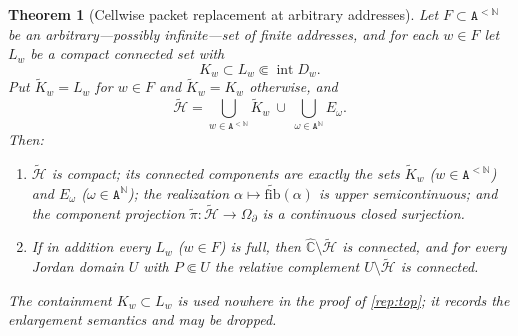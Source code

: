 \documentclass[11pt,reqno]{amsart}
\numberwithin{equation}{section}
\theoremstyle{plain}
\newtheorem{theorem}{Theorem}[section]
\theoremstyle{definition}
\theoremstyle{remark}
\newcommand{\Chat}{\widehat{\mathbb C}}
\newcommand{\N}{\mathbb N}
\newcommand{\A}{\mathtt A}
\newcommand{\Words}{\A^{<\N}}
\newcommand{\Ends}{\A^{\N}}
\newcommand{\OmB}{\Omega_\partial}
\begin{document}
\begin{theorem}[Cellwise packet replacement at arbitrary addresses]
\label{thm:cellwise-replacement}
Let $F\subset\Words$ be an arbitrary---possibly infinite---set of
finite addresses, and for each $w\in F$ let $L_w$ be a compact
connected set with
\begin{equation}
 K_w\subset L_w\Subset\operatorname{int}D_w .
\label{eq:replacement-data}
\end{equation}
Put $\widetilde K_w=L_w$ for $w\in F$ and $\widetilde K_w=K_w$
otherwise, and
\begin{equation}
 \widetilde{\mathcal H}
 =
 \bigcup_{w\in\Words}\widetilde K_w
 \ \cup\
 \bigcup_{\omega\in\Ends}E_\omega .
\label{eq:replaced}
\end{equation}
Then:
\begin{enumerate}[label=\textup{(\roman*)}]
 \item \label{rep:top} $\widetilde{\mathcal H}$ is compact; its
  connected components are exactly the sets $\widetilde K_w$
  ($w\in\Words$) and $E_\omega$ ($\omega\in\Ends$); the realization
  $\alpha\mapsto\widetilde{\mathrm{fib}}(\alpha)$ is upper
  semicontinuous; and the component projection
  $\widetilde\pi\colon\widetilde{\mathcal H}\to\OmB$ is a continuous
  closed surjection.
 \item \label{rep:full} If in addition every $L_w$ ($w\in F$) is full,
  then $\Chat\setminus\widetilde{\mathcal H}$ is connected, and for
  every Jordan domain $U$ with $P\Subset U$ the relative complement
  $U\setminus\widetilde{\mathcal H}$ is connected.
\end{enumerate}
The containment $K_w\subset L_w$ is used nowhere in the proof of
\ref{rep:top}; it records the enlargement semantics and may be dropped.
\end{theorem}
\end{document}
